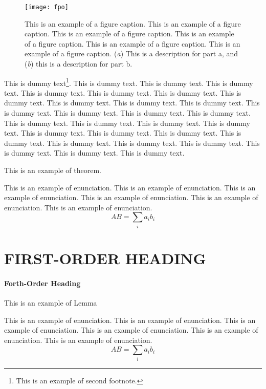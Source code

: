 \documentclass{aer}      %
\begin{document}
\begin{figure}
\begin{center}
\texttt{[image: fpo]}%
\end{center}
\caption{This is an example of a figure caption. This is an example of a figure caption. This is an example of a figure caption. This is an example of a figure caption. This is an example of a figure caption. This is an example of a figure caption. (\textit{a}) This is a description for part a, and (\textit{b}) this is a description for part b.}\label{fig3}
\end{figure}


This is dummy text\footnote{This is an example of second footnote.}. This is dummy text. This is dummy text. This is dummy text. This is dummy text. This is dummy text. This is dummy text. This is dummy text. This is dummy text. This is dummy text. This is dummy text. This is dummy text. This is dummy text. This is dummy text. This is dummy text. This is dummy text. This is dummy text. This is dummy text. This is dummy text. This is dummy text. This is dummy text. This is dummy text. This is dummy text. This is dummy text. This is dummy text. This is dummy text. This is dummy text. This is dummy text. This is dummy text.

This is an example of theorem.
\begin{theorem}
This is an example of enunciation. This is an example of enunciation. This is an example of enunciation. This is an example of enunciation. This is an example of enunciation. This is an example of enunciation. 
       \[ {A}{B} = \sum_{i} a_{i} b_{i}\]
\end{theorem}



\section{FIRST-ORDER HEADING}%
\paragraph{Forth-Order Heading}%


This is an example of Lemma
\begin{lemma}
This is an example of enunciation. This is an example of enunciation. This is an example of enunciation. This is an example of enunciation. This is an example of enunciation. This is an example of enunciation. 
       \[ {A}{B} = \sum_{i} a_{i} b_{i}\]
\end{lemma}
\end{document}
